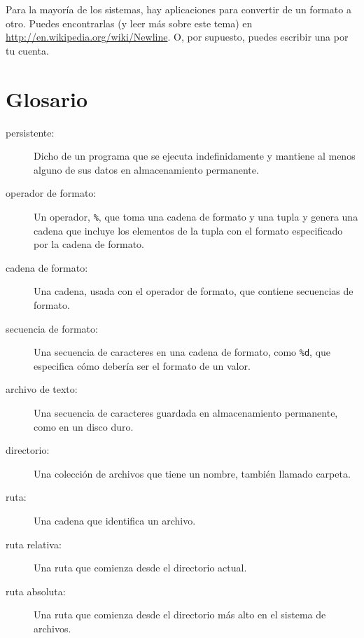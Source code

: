 \documentclass[10pt]{book}
\begin{document}
Para la mayoría de los sistemas, hay aplicaciones para convertir de
un formato a otro.  Puedes encontrarlas (y leer más sobre este
tema) en \url{http://en.wikipedia.org/wiki/Newline}.  O, por supuesto,
puedes escribir una por tu cuenta.


\section{Glosario}

\begin{description}

\item[persistente:] Dicho de un programa que se ejecuta indefinidamente
y mantiene al menos alguno de sus datos en almacenamiento permanente.

\item[operador de formato:] Un operador, {\tt \%}, que toma una cadena
de formato y una tupla y genera una cadena que incluye
los elementos de la tupla con el formato especificado por la cadena de formato.

\item[cadena de formato:] Una cadena, usada con el operador de formato, que
contiene secuencias de formato.

\item[secuencia de formato:] Una secuencia de caracteres en una cadena de formato,
como {\tt \%d}, que especifica cómo debería ser el formato de un valor.

\item[archivo de texto:] Una secuencia de caracteres guardada en almacenamiento
permanente, como en un disco duro.

\item[directorio:] Una colección de archivos que tiene un nombre, también llamado carpeta.

\item[ruta:] Una cadena que identifica un archivo.

\item[ruta relativa:] Una ruta que comienza desde el directorio actual.

\item[ruta absoluta:] Una ruta que comienza desde el directorio más alto
en el sistema de archivos.


\end{description}
\end{document}
